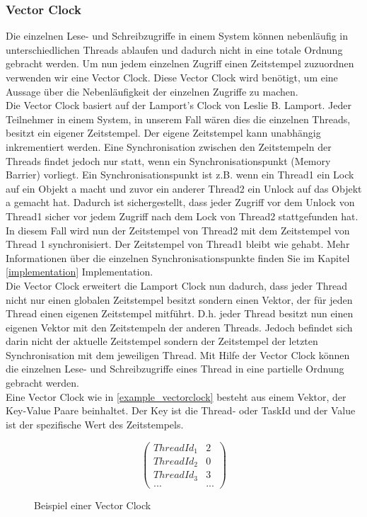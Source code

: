 \documentclass[10pt,a4paper]{article}
\begin{document}
\subsubsection{Vector Clock}
Die einzelnen Lese- und Schreibzugriffe in einem System können nebenläufig in unterschiedlichen Threads ablaufen und dadurch nicht in eine totale Ordnung gebracht werden. Um nun jedem einzelnen Zugriff einen Zeitstempel zuzuordnen verwenden wir eine Vector Clock. Diese Vector Clock wird benötigt, um eine Aussage über die Nebenläufigkeit der einzelnen Zugriffe zu machen.\\
Die Vector Clock basiert auf der Lamport's Clock von Leslie B. Lamport. Jeder Teilnehmer in einem System, in unserem Fall wären dies die einzelnen Threads, besitzt ein eigener Zeitstempel. Der eigene Zeitstempel kann unabhängig inkrementiert werden. Eine Synchronisation zwischen den Zeitstempeln der Threads findet jedoch nur statt, wenn ein Synchronisationspunkt (Memory Barrier) vorliegt. Ein Synchronisationspunkt ist z.B. wenn ein Thread1 ein Lock auf ein Objekt a macht und zuvor ein anderer Thread2 ein Unlock auf das Objekt a gemacht hat. Dadurch ist sichergestellt, dass jeder Zugriff vor dem Unlock von Thread1 sicher vor jedem Zugriff nach dem Lock von Thread2 stattgefunden hat. In diesem Fall wird nun der Zeitstempel von Thread2 mit dem Zeitstempel von Thread 1 synchronisiert. Der Zeitstempel von Thread1 bleibt wie gehabt. Mehr Informationen über die einzelnen Synchronisationspunkte finden Sie im Kapitel \ref{implementation} Implementation.\\
Die Vector Clock erweitert die Lamport Clock nun dadurch, dass jeder Thread nicht nur einen globalen Zeitstempel besitzt sondern einen Vektor, der für jeden Thread einen eigenen Zeitstempel mitführt. D.h. jeder Thread besitzt nun einen eigenen Vektor mit den Zeitstempeln der anderen Threads. Jedoch befindet sich darin nicht der aktuelle Zeitstempel sondern der Zeitstempel der letzten Synchronisation mit dem jeweiligen Thread. Mit Hilfe der Vector Clock können die einzelnen Lese- und Schreibzugriffe eines Thread in eine partielle Ordnung gebracht werden.\\
Eine Vector Clock wie in \autoref{example_vectorclock} besteht aus einem Vektor, der Key-Value Paare beinhaltet. Der Key ist die Thread- oder TaskId und der Value ist der spezifische Wert des Zeitstempels.\\
\begin{figure}[H]
\[
	\begin{pmatrix}
		ThreadId_1 & 2\\
		ThreadId_2 & 0\\
		ThreadId_3 & 3\\
		... & ...
	\end{pmatrix}
\]
\caption{Beispiel einer Vector Clock}\label{example_vectorclock}
\end{figure}
\newpage
\end{document}
